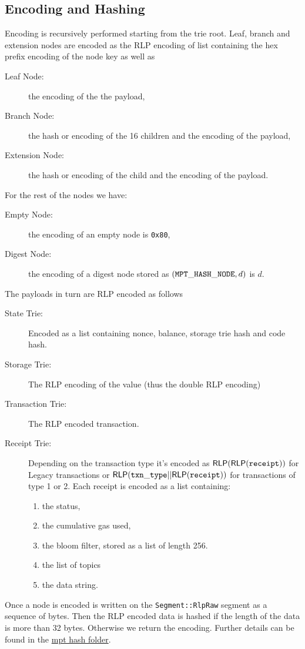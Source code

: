 \subsection{Encoding and Hashing}

Encoding is recursively performed starting from the trie root. Leaf, branch and extension nodes are encoded as the RLP encoding of list containing the hex prefix encoding of the node key as well as

\begin{description}
	\item[Leaf Node:] the encoding of the the payload,
	\item[Branch Node:] the hash or encoding of the 16 children and the encoding of the payload,
	\item[Extension Node:] the hash or encoding of the child and the encoding of the payload.
\end{description}
For the rest of the nodes we have:
\begin{description}
	\item[Empty Node:] the encoding of an empty node is {\tt 0x80},
	\item[Digest Node:] the encoding of a digest node stored as $({\tt MPT\_HASH\_NODE}, d)$ is $d$.
\end{description}

The payloads in turn are RLP encoded as follows
\begin{description}
	\item[State Trie:] Encoded as a list containing nonce, balance, storage trie hash and code hash.
	\item[Storage Trie:] The RLP encoding of the value (thus the double RLP encoding)
	\item[Transaction Trie:] The RLP encoded transaction.
	\item[Receipt Trie:] Depending on the transaction type it's encoded as ${\sf RLP}({\sf RLP}({\tt receipt}))$ for Legacy transactions or ${\sf RLP}({\tt txn\_type}||{\sf RLP}({\tt receipt}))$ for transactions of type 1 or 2. Each receipt is encoded as a list containing:
	\begin{enumerate}
		\item the status,
		\item the cumulative gas used,
		\item the bloom filter, stored as a list of length 256.
		\item the list of topics
		\item the data string.
	\end{enumerate}
\end{description}

Once a node is encoded is written on the {\tt Segment::RlpRaw} segment as a sequence of bytes. Then the RLP encoded data is hashed if the length of the data is more than 32 bytes. Otherwise we return the encoding. Further details can be found in the \href{https://github.com/0xPolygonZero/plonky2/tree/main/evm/src/cpu/mpt/hash}{mpt hash folder}.